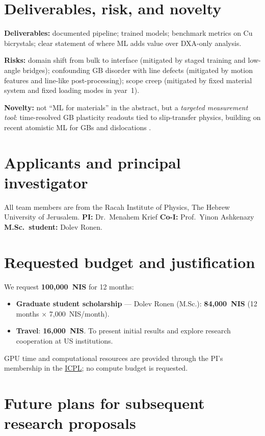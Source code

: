 \documentclass[11pt]{article}
\begin{document}
\section*{Deliverables, risk, and novelty}
\textbf{Deliverables:} documented pipeline; trained models; benchmark metrics on Cu bicrystals; clear statement of where ML adds value over DXA-only analysis.

\textbf{Risks:} domain shift from bulk to interface (mitigated by staged training and low-angle bridges); confounding GB disorder with line defects (mitigated by motion features and line-like post-processing); scope creep (mitigated by fixed material system and fixed loading modes in year~1).

\textbf{Novelty:} not ``ML for materials'' in the abstract, but a \emph{targeted measurement tool}: time-resolved GB plasticity readouts tied to slip-transfer physics, building on recent atomistic ML for GBs and dislocations \cite{Noh2024,Sharp2018}.

\section*{Applicants and principal investigator}

All team members are from the Racah Institute of Physics, The Hebrew University of Jerusalem.
\textbf{PI:} Dr.\ Menahem Krief
\textbf{Co-I:} Prof.\ Yinon Ashkenazy
\textbf{M.Sc.\ student:} Dolev Ronen.

\section*{Requested budget and justification}

We request \textbf{100,000~NIS} for 12 months:
\begin{itemize}
    \item \textbf{Graduate student scholarship} --- Dolev Ronen (M.Sc.): \textbf{84,000~NIS} (12 months $\times$ 7,000~NIS/month).
    \item \textbf{Travel}: \textbf{16,000~NIS}. To present initial results and explore research cooperation at US institutions.
\end{itemize}
GPU time and computational resources are provided through the PI's membership in the \href{http://icpl.huji.ac.il}{ICPL}; no compute budget is requested.

\section*{Future plans for subsequent research proposals}
\end{document}
